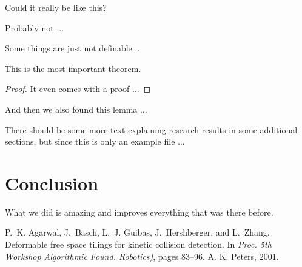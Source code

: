 \documentclass{cgyrf12}
\begin{document}
\begin{conj}
Could it really be like this?
\end{conj}
\begin{obs}
Probably not ...
\end{obs}

\begin{definition}
Some things are just not definable ..
\end{definition}

\begin{theorem}
This is the most important theorem.
\end{theorem}
\begin{proof}
It even comes with a proof ...
\end{proof}

\begin{lemma}
And then we also found this lemma ...
\end{lemma}

There should be some more text explaining research results in some additional sections, but since this is only an example file ...

\section{Conclusion}

What we did is amazing and improves everything that was there before.


\small


\begin{thebibliography}{99}


P.~K. Agarwal, J.~Basch, L.~J. Guibas, J.~Hershberger, and L.~Zhang.
\newblock Deformable free space tilings for kinetic collision detection.
\newblock In {\em Proc. 5th Workshop Algorithmic Found.
  Robotics)}, pages 83--96. A. K. Peters, 2001.


\end{thebibliography}
\end{document}
